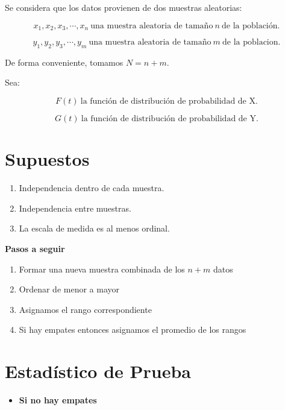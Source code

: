 \documentclass[
  a4paper,
  oneside,
  openany]{book}
\providecommand{\tightlist}{%
  \setlength{\itemsep}{0pt}\setlength{\parskip}{0pt}}
\begin{document}
Se considera que los datos provienen de dos muestras aleatorias:

\[x_{1},x_{2},x_{3},\cdots,x_{n} \ \mbox{una muestra aleatoria de tamaño} \ n \ \mbox{de la población.}\]

\[y_{1},y_{2},y_{3},\cdots,y_{m} \ \mbox{una muestra aleatoria de tamaño} \  m \  \mbox{de la poblacion.}\]

De forma conveniente, tomamos \(N=n+m\).

Sea:

\[F(t) \ \mbox{la función de distribución de probabilidad de X.}\]

\[G(t) \ \mbox{la función de distribución de probabilidad de Y.}\]

\hypertarget{supuestos-5}{%
\section{Supuestos}\label{supuestos-5}}

\begin{enumerate}
\def\labelenumi{\arabic{enumi})}
\item
  Independencia dentro de cada muestra.
\item
  Independencia entre muestras.
\item
  La escala de medida es al menos ordinal.
\end{enumerate}

\textbf{Pasos a seguir}

\begin{enumerate}
\def\labelenumi{\arabic{enumi}.}
\item
  Formar una nueva muestra combinada de los \(n+m\) datos
\item
  Ordenar de menor a mayor
\item
  Asignamos el rango correspondiente
\item
  Si hay empates entonces asignamos el promedio de los rangos
\end{enumerate}

\hypertarget{estaduxedstico-de-prueba-5}{%
\section{Estadístico de Prueba}\label{estaduxedstico-de-prueba-5}}

\begin{itemize}
\tightlist
\item
  \textbf{Si no hay empates}
\end{itemize}
\end{document}
